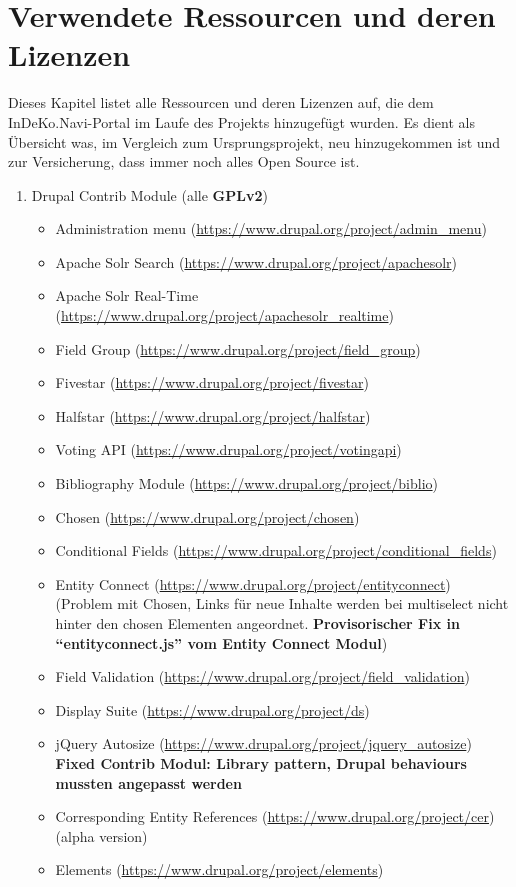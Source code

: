 \section{Verwendete Ressourcen und deren Lizenzen}\label{sub:license}
Dieses Kapitel listet alle Ressourcen und deren Lizenzen auf, die dem InDeKo.Navi-Portal im Laufe des Projekts hinzugefügt wurden. Es dient als Übersicht was, im Vergleich zum Ursprungsprojekt, neu hinzugekommen ist und zur Versicherung, dass immer noch alles Open Source ist.

\begin{enumerate}
	\item Drupal Contrib Module (alle \textbf{GPLv2})
	\begin{itemize}
		\item Administration menu (\url{https://www.drupal.org/project/admin_menu}) 
		\item Apache Solr Search (\url{https://www.drupal.org/project/apachesolr})
		\item Apache Solr Real-Time (\url{https://www.drupal.org/project/apachesolr_realtime})
		\item Field Group (\url{https://www.drupal.org/project/field_group})
		\item Fivestar (\url{https://www.drupal.org/project/fivestar})
		\item Halfstar (\url{https://www.drupal.org/project/halfstar})
		\item Voting API (\url{https://www.drupal.org/project/votingapi})
		\item Bibliography Module (\url{https://www.drupal.org/project/biblio})
		\item Chosen (\url{https://www.drupal.org/project/chosen})
		\item Conditional Fields (\url{https://www.drupal.org/project/conditional_fields})
		\item Entity Connect (\url{https://www.drupal.org/project/entityconnect}) (Problem mit Chosen, Links für neue Inhalte werden bei multiselect nicht hinter den chosen Elementen angeordnet. \textbf{Provisorischer Fix in \enquote{entityconnect.js} vom Entity Connect Modul})
		\item Field Validation (\url{https://www.drupal.org/project/field_validation})
		\item Display Suite (\url{https://www.drupal.org/project/ds})
		\item jQuery Autosize (\url{https://www.drupal.org/project/jquery_autosize}) \textbf{Fixed Contrib Modul: Library pattern, Drupal behaviours mussten angepasst werden}
		\item Corresponding Entity References (\url{https://www.drupal.org/project/cer}) (alpha version)  
		\item Elements (\url{https://www.drupal.org/project/elements})
	\end{itemize}


\end{enumerate}
